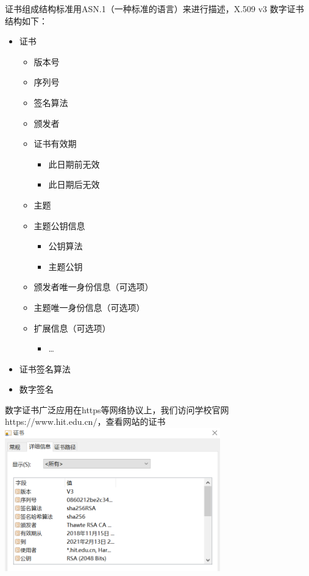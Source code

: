 \documentclass{ctexart}
\begin{document}
证书组成结构标准用ASN.1（一种标准的语言）来进行描述，X.509 v3 数字证书结构如下：
\begin{itemize}
    \item 证书 \begin{itemize}
              \item 版本号
              \item 序列号
              \item 签名算法
              \item 颁发者
              \item 证书有效期 \begin{itemize}
                        \item 此日期前无效
                        \item 此日期后无效
                    \end{itemize}
              \item 主题
              \item 主题公钥信息 \begin{itemize}
                        \item 公钥算法
                        \item 主题公钥
                    \end{itemize}
              \item 颁发者唯一身份信息（可选项）
              \item 主题唯一身份信息（可选项）
              \item 扩展信息（可选项）\begin{itemize}
                        \item \ldots
                    \end{itemize}
          \end{itemize}
    \item 证书签名算法
    \item 数字签名
\end{itemize}
数字证书广泛应用在https等网络协议上，我们访问学校官网https://www.hit.edu.cn/，查看网站的证书\\

\includegraphics[width=0.7\textwidth]{Clipboard_2021-01-01-16-15-49.png}
\end{document}
